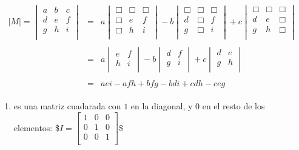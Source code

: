 \documentclass[letterpaper,10pt,english]{jupyterBook}
\begin{document}
\begin{equation*}
\begin{split}
\begin{eqnarray*}
|M| = \begin{vmatrix}
a & b & c \\
d & e & f \\
g & h & i \\
\end{vmatrix} & = & a\begin{vmatrix}
\Box &\Box  &\Box  \\
\Box & e & f \\
\Box & h & i \\
\end{vmatrix} - b\begin{vmatrix}
\Box &\Box  &\Box  \\
d & \Box & f \\
g & \Box & i \\
\end{vmatrix}+c\begin{vmatrix}
\Box &\Box  &\Box  \\
d & e & \Box \\
g & h & \Box \\
\end{vmatrix} \\
&&\\
& = & a\begin{vmatrix}
e & f \\
h & i \\
\end{vmatrix} - b\begin{vmatrix}
d & f \\
g & i \\
\end{vmatrix}+c\begin{vmatrix}
d & e \\
g & h \\
\end{vmatrix} \\ 
&&\\
& = & aei - afh + bfg - bdi + cdh - ceg 
\end{eqnarray*}\end{split}
\end{equation*}\begin{enumerate}
%
\item {} 
\sphinxAtStartPar
{} es una matriz cuadarada con \(1\) en la diagonal, y \(0\) en el resto de los elementos:
\$\(I = \begin{bmatrix}
1 & 0 & 0 \\
0 & 1 & 0 \\
0 & 0 & 1 \\
\end{bmatrix}\)\$

\end{enumerate}
\end{document}
